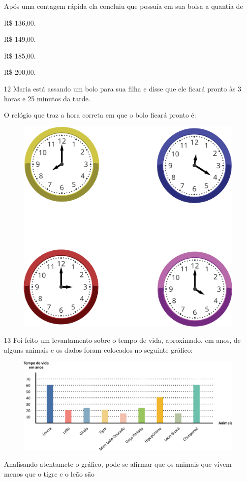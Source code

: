 Após uma contagem rápida ela concluiu que possuía em sua bolsa a quantia de

\begin{escolha}
\item
  R\$ 136,00.
\item
  R\$ 149,00.
\item
  R\$ 185,00.
\item
  R\$ 200,00.
\end{escolha}


\num{12} Maria está assando um bolo para sua filha e disse que ele ficará pronto às 3 horas e 25 minutos da tarde.

O relógio que traz a hora correta em que o bolo ficará pronto é:

\begin{figure}[htpb!]
\centering
\includegraphics[width=.45\textwidth]{./media/image111.png}
\end{figure}


\pagebreak
\num{13} Foi feito um levantamento sobre o tempo de vida, aproximado, em anos, de alguns animais e os dados foram colocados no seguinte gráfico:

\begin{figure}[htpb!]
\centering
\includegraphics[width=\textwidth]{./media/image112.png}
\end{figure}

Analisando atentamete o gráfico, pode-se afirmar que os animais que vivem menos que o tigre e o leão são

